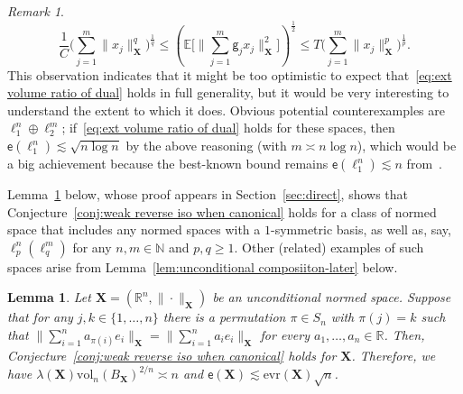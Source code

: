 \documentclass[11pt,reqno]{amsart}
\renewcommand{\le}{\leqslant}
\renewcommand{\ge}{\geqslant}
\newcommand{\evr}{\mathrm{evr}}
\newcommand{\n}{\{1,\ldots,n\}}
\newcommand{\X}{\mathbf X}
\newcommand{\R}{\mathbb R}
\newtheorem{lemma}[theorem]{Lemma}
\theoremstyle{remark}
\newtheorem{remark}[theorem]{Remark}
\newcommand{\E}{\mathbb{ E}}
\newcommand{\N}{\mathbb N}
\newcommand{\ee}{\mathsf{e}}
\newcommand{\vol}{\mathrm{vol}}
\renewcommand{\1}{\mathbf 1}
\newcommand{\g}{\mathsf{g}}
\begin{document}
\begin{remark}
\begin{equation}\label{eq:def type cotype}
\frac{1}{C}\bigg(\sum_{j=1}^m\|x_j\|^q_{\X}\bigg)^{\frac{1}{q}}\le \left(\E\bigg[\Big\|\sum_{j=1}^m \g_j x_j\Big\|_{\X}^2\bigg]\right)^{\frac12} \le T\bigg(\sum_{j=1}^m\|x_j\|^p_{\X}\bigg)^{\frac{1}{p}}.
\end{equation}
 This observation indicates that it might be too optimistic to expect that~\eqref{eq:ext volume ratio of dual} holds in full generality, but it would be very interesting to understand the extent to which it does. Obvious potential counterexamples  are  $\ell_1^n\oplus \ell_2^m$; if~\eqref{eq:ext volume ratio of dual}  holds for these spaces, then $\ee(\ell_1^n)\lesssim \sqrt{n\log n}$ by the above reasoning (with $m\asymp n\log n$), which would be a big achievement because  the best-known bound  remains $\ee(\ell_1^n)\lesssim n$ from~\cite{JLS86}.
\end{remark}



Lemma~\ref{lem:weak iso for enouhg permutations and unconditional} below, whose proof appears in Section~\ref{sec:direct}, shows that Conjecture~\ref{conj:weak reverse iso when canonical} holds for a class of normed space that includes any normed spaces with a $1$-symmetric basis, as well as, say, $\ell_p^n(\ell_q^m)$ for any $n,m\in \N$ and $p,q\ge 1$. Other (related) examples of such spaces arise from Lemma~\ref{lem:unconditional composiiton-later}  below.






\begin{lemma}\label{lem:weak iso for enouhg permutations and unconditional}
Let $\X=(\R^n,\|\cdot\|_\X)$ be an unconditional normed space. Suppose that for any $j,k\in \n$ there is a permutation $\pi\in S_n$ with $\pi(j)=k$ such that $\|\sum_{i=1}^n a_{\pi(i)}e_i\|_\X= \|\sum_{i=1}^n a_{i}e_i\|_\X$ for every $a_1,\ldots,a_n\in \R$. Then, Conjecture~\ref{conj:weak reverse iso when canonical} holds for $\X$. Therefore, we have $\lambda(\X)\vol_n(B_\X)^{2/n}\asymp n$ and  $\ee(\X)\lesssim \evr(\X)\sqrt{n}$.
\end{lemma}
\end{document}
